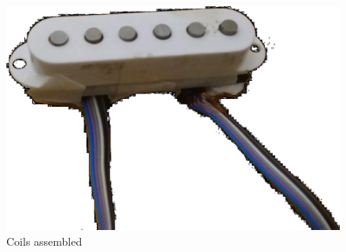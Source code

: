 \begin{figure}[!htpb]
  \centering
  \caption{Coils assembled}
  \label{assembled-pickup}
  \includegraphics[scale=0.08]{images/assembled-pickup}
\end{figure}
